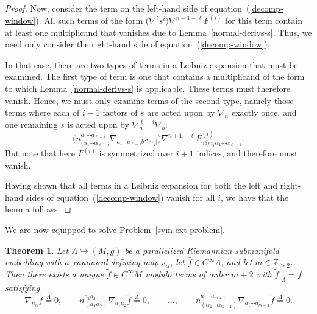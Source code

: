 \documentclass[pdftex]{sigma}
\numberwithin{equation}{section}
\newtheorem{Theorem}{Theorem}[section]
\renewcommand{\=}{\stackrel \Lambda =}
\begin{document}
\begin{proof}
Now, consider the term on the left-hand side of equation~(\ref{decomp-window}). All such terms of the form $\bigl(\nabla^\ell s^i\bigr) \nabla^{n+1-\ell} F^{(i)}$ for this term contain at least one multiplicand that vanishes due to Lemma~\ref{normal-derivs-s}. Thus, we need only consider the right-hand side of equation~(\ref{decomp-window}).

In that case, there are two types of terms in a Leibniz expansion that must be examined. The first type of term is one that contains a multiplicand of the form to which Lemma~\ref{normal-derivs-s} is applicable. These terms must therefore vanish. Hence, we must only examine terms of the second type, namely those terms where each of $i-1$ factors of $s$ are acted upon by $\nabla_n$ exactly once, and one remaining $s$ is acted upon by $\nabla_n^{\ell-i} \nabla_b$:
\[\bigl(n^{a_1 \cdots a_{\ell-i}}_{(\alpha_1 \cdots \alpha_{\ell-i}} \nabla_{a_1 \cdots a_{\ell-i}b }s_{|\gamma_1|}\bigr) \nabla^{n+1-\ell} F^{(i)}_{\gamma \delta) \gamma_1 \alpha_1 \cdots \alpha_{\ell-1}} .\]
But note that here $F^{(i)}$ is symmetrized over $i+1$ indices, and therefore must vanish.

Having shown that all terms in a Leibniz expansion for both the left and right-hand sides of equation~(\ref{decomp-window}) vanish for all $i$, we have that the lemma follows.
\end{proof}

We are now equipped to solve Problem~\ref{sym-ext-problem}.
\begin{Theorem} \label{sym-ext-prop}
Let $\Lambda \hookrightarrow (M,g)$ be a parallelized Riemannian submanifold embedding with a~canonical defining map $s_{\alpha}$, let $\bar{f} \in C^\infty \Lambda$, and let $m \in \mathbb{Z}_{\geq 2}$. Then there exists a unique $\tilde{f} \in C^\infty M$ modulo terms of order $m+2$ with $\tilde{f}|_{\Lambda} = \bar{f}$ satisfying
\[\nabla_{n_{\alpha}} \tilde{f} \= 0 , \qquad n^{a_1 a_2}_{(\alpha_1 \alpha_2)} \nabla_{a_1 a_2} \tilde{f} \= 0 , \qquad \ldots , \qquad n^{a_1 \cdots a_{m+1}}_{(\alpha_1 \cdots \alpha_{m+1})} \nabla_{a_1 \cdots a_{m+1}} \tilde{f} \= 0 .\]
\end{Theorem}
\end{document}
